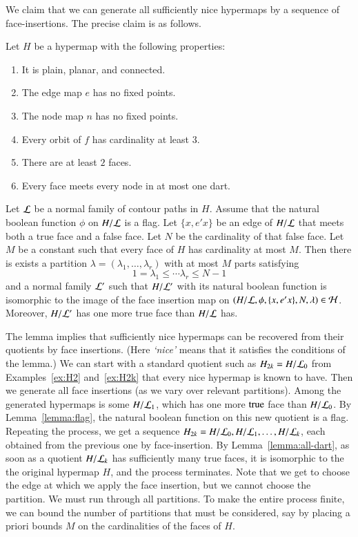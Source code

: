 We claim that we can generate all sufficiently nice hypermaps by a
sequence of face-insertions.  The precise claim is as follows.

\begin{lemma}  Let $H$ be a hypermap with the following properties:
    \begin{enumerate}
        \item It is plain, planar, and connected.
        \item The edge map $e$ has no fixed points.
        \item The node map $n$ has no fixed points.
        \item Every orbit of $f$ has cardinality at least $3$.
        \item There are at least $2$ faces. 
        \item Every face meets every node in at most one
        dart.
    \end{enumerate}
Let $\cal L$ be a normal family of contour paths in $H$. Assume that
the natural boolean function $\phi$ on $H/{\cal L}$ is a flag. Let
$\{x,e' x\}$ be an edge of $H/{\cal L}$ that meets both a true face
and a false face. Let $N$ be the cardinality of that false face. Let
$M$ be a constant such that every face of $H$ has cardinality at
most $M$. Then there is exists a partition $\lambda=(\lambda_1,\ldots,\lambda_r)$ with at most
$M$ parts satisfying $$1=\lambda_1\le \cdots\lambda_r \le N-1$$
and a normal family
${\cal L}'$ such that $H/{\cal L}'$ with its natural boolean
function is isomorphic to the image of the face insertion map on
$(H/{\cal L},\phi,\{x,e' x\},N,\lambda)\in {\cal H}$. 
Moreover, $H/{\cal L}'$
has one more true face than $H/{\cal L}$ has.
\end{lemma}

\begin{remark} The lemma implies that sufficiently nice hypermaps can be recovered
from their quotients by face insertions.  (Here {\it `nice'} means
that it satisfies the conditions of the lemma.)   
We can start with a standard quotient such 
as $H_{2k}=H/{\cal L}_0$
from Examples~\ref{ex:H2} and~\ref{ex:H2k} 
that every nice hypermap is known to have. Then we
generate all face insertions (as we vary over relevant partitions).
Among the generated hypermaps is some $H/{\cal L}_1$, which
has one more ${\operatorname{true}}$ face than $H/{\cal L}_0$.  By 
Lemma~\ref{lemma:flag}, 
the natural boolean function on this new quotient
is a flag.  Repeating the process, we get a sequence
$H_{2k} = H/{\cal L}_0, H/{\cal L}_1,\ldots, H/{\cal L}_k$,
each obtained from the previous one by face-insertion.
By Lemma~\ref{lemma:all-dart}, 
as
soon as a quotient $H/{\cal L}_k$ 
has sufficiently many true faces, it is
isomorphic to the the original hypermap $H$, and the process
terminates.
Note that we get to choose the edge at which we apply the face
insertion, but we cannot choose the partition.  We must run through
all partitions.  To make the entire process finite, we can bound the
number of partitions that must be considered, say by placing a
priori bounds $M$ on the cardinalities of the faces of $H$.
\end{remark}

